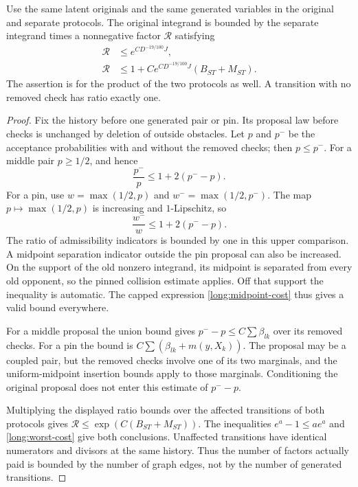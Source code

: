 \begin{lemma}\label{long:transitions}
Use the same latent originals and the same generated variables in the
original and separate protocols.  The original integrand is bounded by
the separate integrand times a nonnegative factor $\mathcal R$ satisfying
\begin{align}
 \mathcal R&\le e^{C D^{-19/100}J},
                                  \label{long:factor-exponential}\\
 \mathcal R&\le 1+C e^{C D^{-19/100}J}(B_{ST}+M_{ST}).
                                  \label{long:factor-increment}
\end{align}
The assertion is for the product of the two protocols as well.  A
transition with no removed check has ratio exactly one.
\end{lemma}
\begin{proof}
Fix the history before one generated pair or pin.  Its proposal law
before checks is unchanged by deletion of outside obstacles.  Let $p$
and $p^-$ be the acceptance probabilities with and without the removed
checks; then $p\le p^-$.  For a middle pair $p\ge1/2$, and hence
\[
             \frac{p^-}{p}\le 1+2(p^- -p).
\]
For a pin, use $w=\max(1/2,p)$ and $w^- =\max(1/2,p^-)$.  The map
$p\mapsto\max(1/2,p)$ is increasing and $1$-Lipschitz, so
\[
             \frac{w^-}{w}\le 1+2(p^- -p).
\]
The ratio of admissibility indicators is bounded by one in this upper
comparison.  A midpoint separation indicator outside the pin proposal
can also be increased.  On the support of the old nonzero integrand, its
midpoint is separated from every old opponent, so the pinned collision
estimate applies.  Off that support the inequality is automatic.  The
capped expression \eqref{long:midpoint-cost} thus gives a valid bound
everywhere.

For a middle proposal the union bound gives
$p^- -p\le C\sum\beta_{lk}$ over its removed checks.  For a pin the
bound is $C\sum(\beta_{lk}+m(y,X_k))$.  The proposal may be a coupled
pair, but the removed checks involve one of its two marginals, and the
uniform-midpoint insertion bounds apply to those marginals.  Conditioning
the original proposal does not enter this estimate of $p^- -p$.

Multiplying the displayed ratio bounds over the affected transitions of
both protocols gives
$\mathcal R\le\exp(C(B_{ST}+M_{ST}))$.
The inequalities $e^a-1\le ae^a$ and
\eqref{long:worst-cost} give both conclusions.  Unaffected transitions
have identical numerators and divisors at the same history.  Thus the
number of factors actually paid is bounded by the number of graph edges,
not by the number of generated transitions.
\end{proof}

